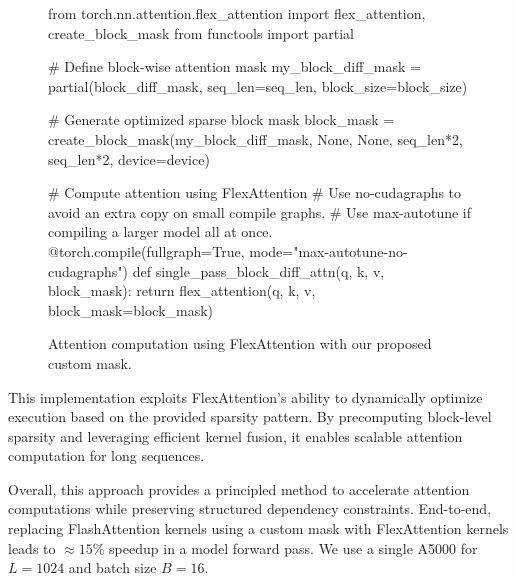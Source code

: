 \documentclass{article} %
\begin{document}
\begin{figure}
    \centering
\begin{minipage}{\linewidth}
\begin{python}
from torch.nn.attention.flex_attention import flex_attention, create_block_mask
from functools import partial

# Define block-wise attention mask
my_block_diff_mask = partial(block_diff_mask, seq_len=seq_len, block_size=block_size)

# Generate optimized sparse block mask
block_mask = create_block_mask(my_block_diff_mask, None, None, seq_len*2, seq_len*2, device=device)

# Compute attention using FlexAttention
# Use no-cudagraphs to avoid an extra copy on small compile graphs. 
# Use max-autotune if compiling a larger model all at once.
@torch.compile(fullgraph=True, mode="max-autotune-no-cudagraphs")
def single_pass_block_diff_attn(q, k, v, block_mask):
    return flex_attention(q, k, v, block_mask=block_mask)
\end{python}
\end{minipage}
    \caption{Attention computation using FlexAttention with our proposed custom mask.}
\end{figure}



This implementation exploits FlexAttention's ability to dynamically optimize execution based on the provided sparsity pattern. By precomputing block-level sparsity and leveraging efficient kernel fusion, it enables scalable attention computation for long sequences.



Overall, this approach provides a principled method to accelerate attention computations while preserving structured dependency constraints. End-to-end, replacing FlashAttention kernels using a custom mask with FlexAttention kernels leads to $\approx15\%$ speedup in a model forward pass. We use a single A5000 for $L=1024$ and batch size $B=16$.
\newpage
\end{document}
